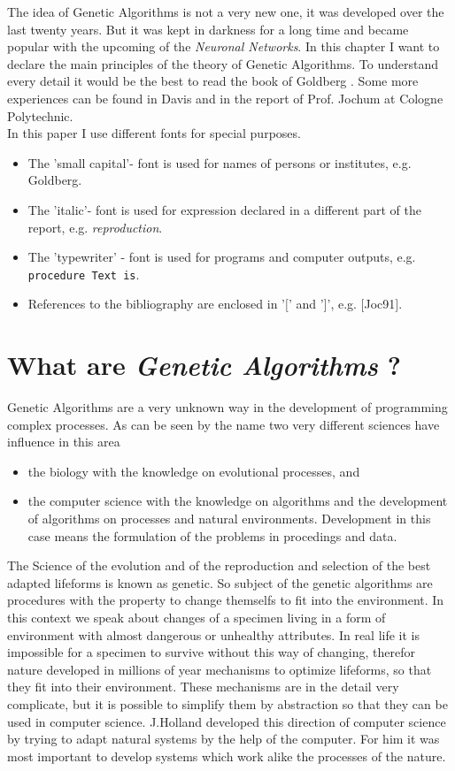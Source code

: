 The idea of Genetic Algorithms is not a very new one, it was developed
over the last twenty years. But it was kept in darkness for a long time and
became popular with the upcoming of the {\it Neuronal Networks}. In this chapter
I want to declare the main principles of the theory of Genetic Algorithms. To
understand every detail it would be the best to read the book of {\sc Goldberg}
\cite{Gol89}. Some more experiences can be found in {\sc Davis}\cite{Dav91} and
in the report of {\sc Prof. Jochum} at {\sc Cologne Polytechnic}\cite{Joc91}.\\
In this paper I use different fonts for special purposes.
\begin{itemize}
  \item The 'small capital'- font is used for names of persons or institutes, e.g. {\sc Goldberg}.
  \item The 'italic'- font is used for expression declared in a different part of
        the report, e.g. {\it reproduction}.
  \item The 'typewriter' - font is used for programs and computer outputs, e.g.
        {\tt procedure Text is}.
  \item References to the bibliography are enclosed in '$[$' and '$]$', e.g.
        $[$Joc91$]$.
\end{itemize}

\section{What are {\it Genetic Algorithms} ?}
Genetic Algorithms are a very unknown way in the development of programming
complex processes. As can be seen by the name two very different sciences
have influence in this area
\begin{itemize}
  \item the biology with the knowledge on evolutional processes, and
  \item the computer science with the knowledge on algorithms and the development
of algorithms on processes and natural environments. Development in this case
means the formulation of the problems in procedings and data\cite{Wir85}.
\end{itemize}
The Science of the evolution and of the reproduction and selection of the best adapted
lifeforms is known as genetic. So subject of the genetic algorithms are procedures
with the property to change themselfs to fit into the environment.
In this context we speak about changes of a specimen living in a form of environment
with almost dangerous or unhealthy attributes.
In real life it is impossible for a specimen to survive without this way of changing,
therefor nature developed in millions of year mechanisms to optimize lifeforms,
so that they fit into their environment. These mechanisms are in the detail very
complicate, but it is possible to simplify them by abstraction so that they can
be used in computer science.
J.Holland developed this direction of computer science by trying  to adapt
natural systems by the help of the computer. For him it was most important to
develop systems which work alike the processes of the nature\cite{Gol89}.
